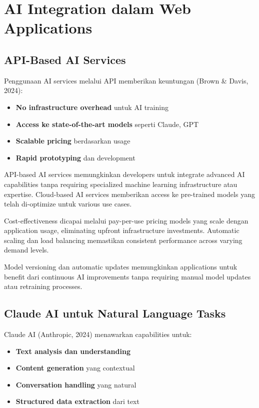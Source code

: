 \section{AI Integration dalam Web Applications}

\subsection{API-Based AI Services}

Penggunaan AI services melalui API memberikan keuntungan (Brown \& Davis, 2024):

\begin{itemize}
\item \textbf{No infrastructure overhead} untuk AI training
\item \textbf{Access ke state-of-the-art models} seperti Claude, GPT
\item \textbf{Scalable pricing} berdasarkan usage
\item \textbf{Rapid prototyping} dan development
\end{itemize}

API-based AI services memungkinkan developers untuk integrate advanced AI capabilities tanpa requiring specialized machine learning infrastructure atau expertise. Cloud-based AI services memberikan access ke pre-trained models yang telah di-optimize untuk various use cases.

Cost-effectiveness dicapai melalui pay-per-use pricing models yang scale dengan application usage, eliminating upfront infrastructure investments. Automatic scaling dan load balancing memastikan consistent performance across varying demand levels.

Model versioning dan automatic updates memungkinkan applications untuk benefit dari continuous AI improvements tanpa requiring manual model updates atau retraining processes.

\subsection{Claude AI untuk Natural Language Tasks}

Claude AI (Anthropic, 2024) menawarkan capabilities untuk:

\begin{itemize}
\item \textbf{Text analysis dan understanding}
\item \textbf{Content generation} yang contextual
\item \textbf{Conversation handling} yang natural
\item \textbf{Structured data extraction} dari text
\end{itemize}

